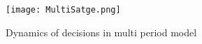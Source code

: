 \documentclass[10pt]{article}
\begin{document}

\begin{figure}[!h]
\begin{center}
\texttt{[image: MultiSatge.png]}
\caption{Dynamics of decisions in multi period model} 
\label{MultistageDynamics}
\end{center}
\end{figure}



\end{document}
